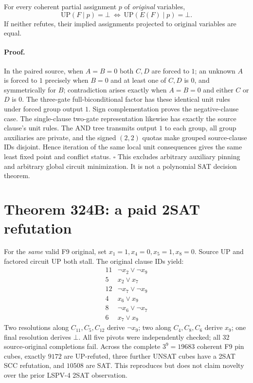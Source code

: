 \documentclass[11pt]{article}
\begin{document}
For every coherent partial assignment $p$ of \emph{original} variables,
\[
\mathrm{UP}(F\mid p)=\bot\ \Longleftrightarrow\ \mathrm{UP}(E(F)\mid p)=\bot.
\]
If neither refutes, their implied assignments projected to original variables are equal.
\paragraph{Proof.} In the paired source, when $A=B=0$ both $C,D$ are forced to $1$; an unknown $A$ is forced to $1$ precisely when $B=0$ and at least one of $C,D$ is $0$, and symmetrically for $B$; contradiction arises exactly when $A=B=0$ and either $C$ or $D$ is $0$. The three-gate full-biconditional factor has these identical unit rules under forced group output $1$. Sign complementation proves the negative-clause case. The single-clause two-gate representation likewise has exactly the source clause's unit rules. The AND tree transmits output $1$ to each group, all group auxiliaries are private, and the signed $(2,2)$ quotas make grouped source-clause IDs disjoint. Hence iteration of the same local unit consequences gives the same least fixed point and conflict status. \(\square\)
This excludes arbitrary auxiliary pinning and arbitrary global circuit minimization. It is not a polynomial SAT decision theorem.

\section{Theorem 324B: a paid 2SAT refutation}
For the \emph{same} valid F9 original, set $x_1=1,x_4=0,x_5=1,x_8=0$. Source UP and factored circuit UP both stall. The original clause IDs yield:
\[
\begin{array}{c|l}
11&\neg x_2\vee\neg x_9\\
5&x_2\vee x_7\\
12&\neg x_7\vee\neg x_9\\
4&x_6\vee x_9\\
8&\neg x_6\vee\neg x_7\\
6&x_7\vee x_9
\end{array}
\]
Two resolutions along $C_{11},C_5,C_{12}$ derive $\neg x_9$; two along $C_4,C_8,C_6$ derive $x_9$; one final resolution derives $\bot$. All five pivots were independently checked; all $32$ source-original completions fail. Across the complete $3^9=19683$ coherent F9 pin cubes, exactly $9172$ are UP-refuted, three further UNSAT cubes have a 2SAT SCC refutation, and $10508$ are SAT. This reproduces but does not claim novelty over the prior LSPV-4 2SAT observation.
\end{document}
